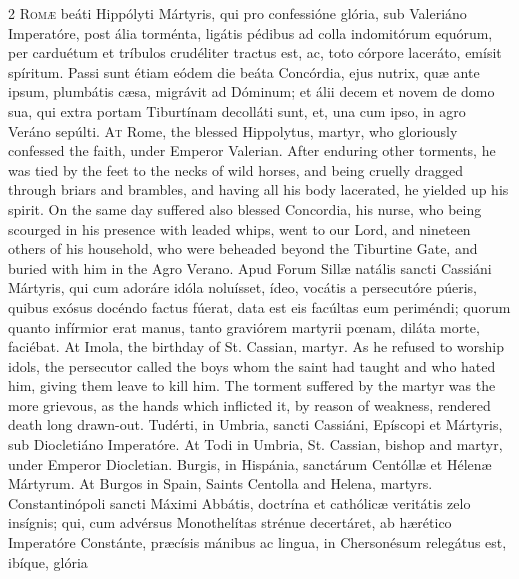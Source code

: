 \begin{paracol}{2}
\lettrine[lines=2]{R}{omæ} beáti Hippólyti 
 Mártyris, qui pro confessióne glória, sub Valeriáno Imperatóre, post ália 
 torménta, ligátis pédibus ad colla indomitórum equórum, per carduétum et 
 tríbulos crudéliter tractus est, ac, toto córpore laceráto, emísit spíritum. 
 Passi sunt étiam eódem die beáta Concórdia, ejus nutrix, quæ ante ipsum, 
 plumbátis cæsa, migrávit ad Dóminum; et álii decem et novem de domo sua, qui 
 extra portam Tiburtínam decolláti sunt, et, una cum ipso, in agro Veráno 
 sepúlti.
\switchcolumn
{}
\lettrine[lines=2]{A}{t} Rome, the blessed Hippolytus, 
 martyr, who gloriously confessed the faith, under Emperor Valerian. 
 After enduring other torments, he was tied by the feet to the necks of wild 
 horses, and being cruelly dragged through briars and brambles, and having 
 all his body lacerated, he yielded up his spirit. On the same day 
 suffered also blessed Concordia, his nurse, who being scourged in his 
 presence with leaded whips, went to our Lord, and nineteen others of his 
 household, who were beheaded beyond the Tiburtine Gate, and buried with him 
 in the Agro Verano.
\switchcolumn*
{}
Apud Forum Sillæ 
 natális sancti Cassiáni Mártyris, qui cum adoráre idóla noluísset, ídeo, 
 vocátis a persecutóre púeris, quibus exósus docéndo factus fúerat, data est 
 eis facúltas eum periméndi; quorum quanto infírmior erat manus, tanto 
 graviórem martyrii pœnam, diláta morte, faciébat.
\switchcolumn
{}
At Imola, the birthday of St. 
 Cassian, martyr. As he refused to worship idols, the persecutor called 
 the boys whom the saint had taught and who hated him, giving them leave to 
 kill him. The torment suffered by the martyr was the more grievous, as 
 the hands which inflicted it, by reason of weakness, rendered death long 
 drawn-out.
\switchcolumn*
{}
Tudérti, in Umbria, 
 sancti Cassiáni, Epíscopi et Mártyris, sub Diocletiáno Imperatóre.
\switchcolumn
{}
At Todi in Umbria, St. Cassian, 
 bishop and martyr, under Emperor Diocletian.
\switchcolumn*
{}
Burgis, in Hispánia, 
 sanctárum Centóllæ et Hélenæ Mártyrum.
\switchcolumn
{}
At Burgos in Spain, Saints Centolla 
 and Helena, martyrs.
\switchcolumn*
{}
Constantinópoli sancti 
 Máximi Abbátis, doctrína et cathólicæ veritátis zelo insígnis; qui, cum 
 advérsus Monothelítas strénue decertáret, ab hærético Imperatóre Constánte, 
 præcísis mánibus ac lingua, in Chersonésum relegátus est, ibíque, glória 

\end{paracol}
